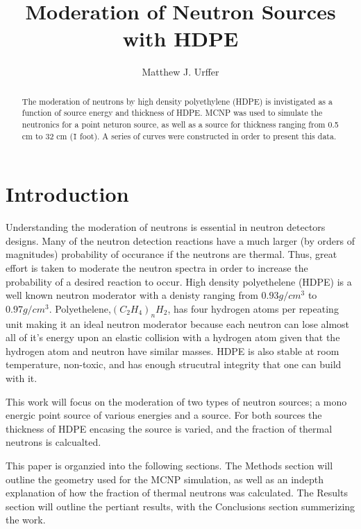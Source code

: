\documentclass[draftcls,onecolumn]{IEEEtran}
\begin{document}
\title{Moderation of Neutron Sources with HDPE}
\author{Matthew J. Urffer}

\maketitle
\begin{abstract}
The moderation of neutrons by high density polyethylene (HDPE) is invistigated as a function of source energy and thickness of HDPE.
MCNP was used to simulate the neutronics for a point neturon source, as well as a  source for thickness ranging from 0.5 cm to 32 cm (\~ 1 foot).
A series of curves were constructed in order to present this data.
\end{abstract}

\IEEEpeerreviewmaketitle

\listoftodos
\pagebreak
\tableofcontents
\pagebreak
\listoffigures
\pagebreak
\listoftables
\pagebreak
\lstlistoflistings

\section{Introduction}
Understanding the moderation of neutrons is essential in neutron detectors designs.
Many of the neutron detection reactions have a much larger (by orders of magnitudes) probability of occurance if the neutrons are thermal.
Thus, great effort is taken to moderate the neutron spectra in order to increase the probability of a desired reaction to occur.
High density polyethelene (HDPE) is a well known neutron moderator with a denisty ranging from $0.93 g/cm^3$ to $0.97 g/cm^3$.
Polyethelene,$\left (C_2 H_4\right )_n H_2$, has four hydrogen atoms per repeating unit making it an ideal neutron moderator because each neutron can lose almost all of it's energy upon an elastic collision with a hydrogen atom given that the hydrogen atom and neutron have similar masses.
HDPE is also stable at room temperature, non-toxic, and has enough strucutral integrity that one can build with it.

This work will focus on the moderation of two types of neutron sources; a mono energic point source of various energies and a  source.
For both sources the thickness of HDPE encasing the source is varied, and the fraction of thermal neutrons is calcualted.


This paper is organzied into the following sections.  The Methods section will outline the geometry used for the MCNP simulation, as well as an indepth explanation of how the fraction of thermal neutrons was calculated.  The Results section will outline the pertiant results, with the Conclusions section summerizing the work.






\appendix

%
%
\end{document}
